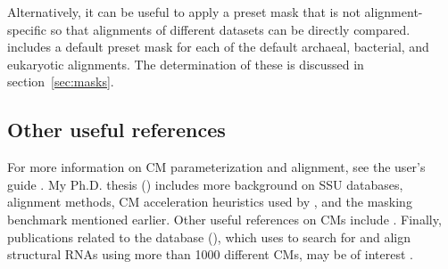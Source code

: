 Alternatively, it can be useful to apply a preset mask that is not
alignment-specific so that alignments of different datasets can be
directly compared.  includes a default preset mask for
each of the default archaeal, bacterial, and eukaryotic
alignments. The determination of these is discussed in
section~\ref{sec:masks}. 

\subsection{Other useful references}

For more information on CM parameterization and alignment, see the
 user's guide \cite{infernalguide}.  My
Ph.D. thesis
()
includes more background on SSU databases, alignment methods, CM
acceleration heuristics used by , and the masking
benchmark mentioned earlier.  Other useful references on CMs include
\cite{Eddy94,Eddy02b,NawrockiEddy07,Nawrocki09,KolbeEddy09}. Finally,
publications related to the  database
(),
which uses  to search for and align structural RNAs
using more than 1000 different CMs, may be of interest
\cite{Griffiths-Jones03,Griffiths-Jones05,Gardner09}.


